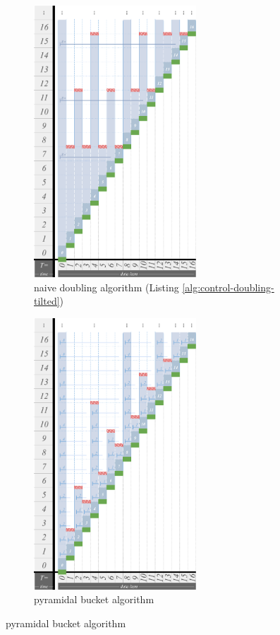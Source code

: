 \begin{figure}
\begin{subfigure}{0.36\linewidth}
\centering
\includegraphics[height=4in]{img/surface-control-tall-zhao-tilted-doubling-naive-desat50}
\centering
\caption{naive doubling algorithm (Listing \ref{alg:control-doubling-tilted})}
\label{fig:surface-control-tilted:naive-doubling}
\end{subfigure}%
\begin{subfigure}{0.32\linewidth}
\centering
\includegraphics[height=4in,trim={2.5cm 0 0 0},clip]{img/surface-control-tall-zhao-desat50}
\centering
\caption{pyramidal bucket algorithm \citep{zhao2005generalized}}
\label{fig:surface-control-tilted:pyramidal}

\end{subfigure}
\end{figure}

